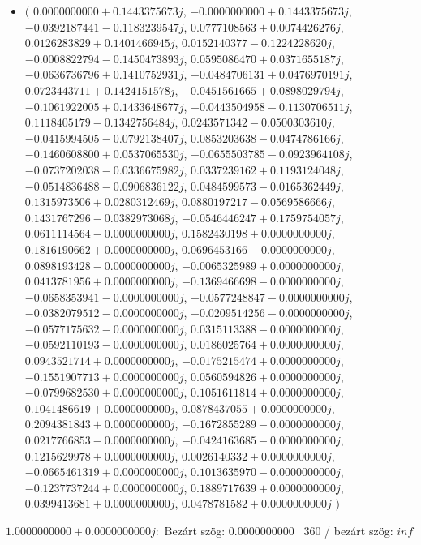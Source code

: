 \documentclass[14pt,a4paper]{article}
\begin{document}
\begin{itemize}
\item
$\big($
$0.0000000000+0.1443375673j$, $-0.0000000000+0.1443375673j$, $-0.0392187441-0.1183239547j$, $0.0777108563+0.0074426276j$, $0.0126283829+0.1401466945j$, $0.0152140377-0.1224228620j$, $-0.0008822794-0.1450473893j$, $0.0595086470+0.0371655187j$, $-0.0636736796+0.1410752931j$, $-0.0484706131+0.0476970191j$, $0.0723443711+0.1424151578j$, $-0.0451561665+0.0898029794j$, $-0.1061922005+0.1433648677j$, $-0.0443504958-0.1130706511j$, $0.1118405179-0.1342756484j$, $0.0243571342-0.0500303610j$, $-0.0415994505-0.0792138407j$, $0.0853203638-0.0474786166j$, $-0.1460608800+0.0537065530j$, $-0.0655503785-0.0923964108j$, $-0.0737202038-0.0336675982j$, $0.0337239162+0.1193124048j$, $-0.0514836488-0.0906836122j$, $0.0484599573-0.0165362449j$, $0.1315973506+0.0280312469j$, $0.0880197217-0.0569586666j$, $0.1431767296-0.0382973068j$, $-0.0546446247+0.1759754057j$, $0.0611114564-0.0000000000j$, $0.1582430198+0.0000000000j$, $0.1816190662+0.0000000000j$, $0.0696453166-0.0000000000j$, $0.0898193428-0.0000000000j$, $-0.0065325989+0.0000000000j$, $0.0413781956+0.0000000000j$, $-0.1369466698-0.0000000000j$, $-0.0658353941-0.0000000000j$, $-0.0577248847-0.0000000000j$, $-0.0382079512-0.0000000000j$, $-0.0209514256-0.0000000000j$, $-0.0577175632-0.0000000000j$, $0.0315113388-0.0000000000j$, $-0.0592110193-0.0000000000j$, $0.0186025764+0.0000000000j$, $0.0943521714+0.0000000000j$, $-0.0175215474+0.0000000000j$, $-0.1551907713+0.0000000000j$, $0.0560594826+0.0000000000j$, $-0.0799682530+0.0000000000j$, $0.1051611814+0.0000000000j$, $0.1041486619+0.0000000000j$, $0.0878437055+0.0000000000j$, $0.2094381843+0.0000000000j$, $-0.1672855289-0.0000000000j$, $0.0217766853-0.0000000000j$, $-0.0424163685-0.0000000000j$, $0.1215629978+0.0000000000j$, $0.0026140332+0.0000000000j$, $-0.0665461319+0.0000000000j$, $0.1013635970-0.0000000000j$, $-0.1237737244+0.0000000000j$, $0.1889717639+0.0000000000j$, $0.0399413681+0.0000000000j$, $0.0478781582+0.0000000000j$
$\big)$
\end{itemize}
$1.0000000000+0.0000000000j$:\
Bezárt szög: $0.0000000000$ \
360 / bezárt szög: $inf$\
\end{document}
